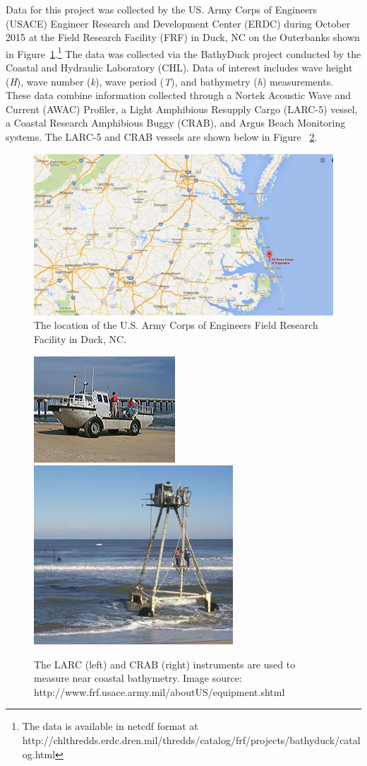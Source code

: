 Data for this project was collected by the US. Army Corps of Engineers (USACE) Engineer Research and Development Center (ERDC) during October 2015 at the Field Research Facility (FRF) in Duck, NC on the Outerbanks shown in Figure~\ref{FRFmap}.\footnote{The data is available in netcdf format at http://chlthredds.erdc.dren.mil/thredds/catalog/frf/projects/bathyduck/catalog.html} The data was collected via the BathyDuck project conducted by the Coastal and Hydraulic Laboratory (CHL). Data of interest includes wave height (\textit{H}), wave number (\textit{k}), wave period (\textit{T}), and bathymetry (\textit{h}) measurements. These data combine information collected through a Nortek Acoustic Wave and Current (AWAC) Profiler, a Light Amphibious Resupply Cargo (LARC-5) vessel, a Coastal Research Amphibious Buggy (CRAB), and Argus Beach Monitoring systems. The LARC-5 and CRAB vessels are shown below in Figure ~\ref{crablarc}.

\begin{figure}[h]
\centering
\includegraphics[width=.48\linewidth]{img/FRF_map.png}
\caption{The location of the U.S. Army Corps of Engineers Field Research Facility in Duck, NC.}
\label{FRFmap}
\end{figure}

\begin{figure}[h]
\includegraphics[width=.48\linewidth]{img/LARC.jpg}\hfill
\includegraphics[width=.48\linewidth]{img/CRAB2.JPG}
\caption{The LARC (left) and CRAB (right) instruments are used to measure near coastal bathymetry. Image source: http://www.frf.usace.army.mil/aboutUS/equipment.shtml}
\label{crablarc}
\end{figure}

